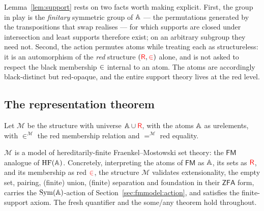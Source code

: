 \begin{remark}
\label{rem:group}
Lemma~\ref{lem:support} rests on two facts worth making explicit. First, the
group in play is the \emph{finitary} symmetric group of $\mathbb{A}$ --- the
permutations generated by the transpositions that $\mathrm{swap}$ realises --- for
which supports are closed under intersection and least supports therefore exist;
on an arbitrary subgroup they need not. Second, the action permutes atoms while
treating each as structureless: it is an automorphism of the \emph{red} structure
$(\textcolor{red}{\mathsf{R}},\mathrel{\textcolor{red}{\in}})$ alone, and is not asked to respect the black membership $\mathrel{\textcolor{black}{\in}}$
internal to an atom. The atoms are accordingly black-distinct but red-opaque, and
the entire support theory lives at the red level.
\end{remark}

\subsection{The representation theorem}
\label{sec:fmmodel:thm}

Let $\mathcal{M}$ be the structure with universe $\mathbb{A}\cup\textcolor{red}{\mathsf{R}}$, with the atoms
$\mathbb{A}$ as urelements, with $\in^{\mathcal M}$ the red membership relation and
$=^{\mathcal M}$ red equality.

\begin{theorem}[Representation]
\label{thm:rep}
$\mathcal{M}$ is a model of hereditarily-finite Fraenkel--Mostowski set theory:
the $\mathsf{FM}$ analogue of $\mathrm{HF}(\mathbb{A})$. Concretely, interpreting the
atoms of $\mathsf{FM}$ as $\mathbb{A}$, its sets as $\textcolor{red}{\mathsf{R}}$, and its membership as red
$\mathrel{\textcolor{red}{\in}}$, the structure $\mathcal{M}$ validates extensionality, the empty set,
pairing, (finite) union, (finite) separation and foundation in their
$\mathsf{ZFA}$ form, carries the $\mathrm{Sym}(\mathbb{A})$-action of
Section~\ref{sec:fmmodel:action}, and satisfies the finite-support axiom. The
fresh quantifier and the some/any theorem hold throughout.
\end{theorem}

